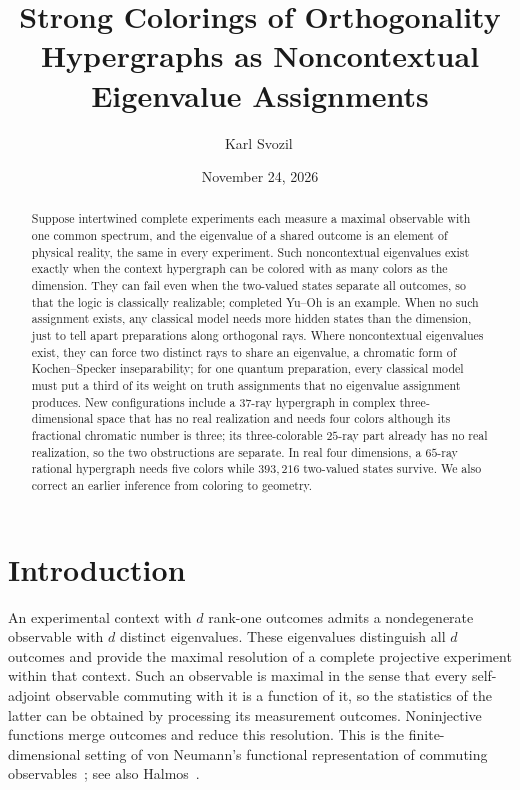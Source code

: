 \documentclass[aps,pra,reprint,superscriptaddress,longbibliography,nofootinbib,floatfix,10pt]{revtex4-2}
\theoremstyle{definition}\newtheorem{definition}[theorem]{Definition}
\theoremstyle{remark}\newtheorem{remark}[theorem]{Remark}
\begin{document}
\title{Strong Colorings of Orthogonality Hypergraphs as Noncontextual Eigenvalue Assignments}
\author{Karl Svozil\,}
\date{November 24, 2026}
\begin{abstract}
Suppose intertwined complete experiments each measure a maximal observable with one common spectrum, and the eigenvalue of a shared outcome is an element of physical reality, the same in every experiment. Such noncontextual eigenvalues exist exactly when the context hypergraph can be colored with as many colors as the dimension. They can fail even when the two-valued states separate all outcomes, so that the logic is classically realizable; completed Yu--Oh is an example. When no such assignment exists, any classical model needs more hidden states than the dimension, just to tell apart preparations along orthogonal rays. Where noncontextual eigenvalues exist, they can force two distinct rays to share an eigenvalue, a chromatic form of Kochen--Specker inseparability; for one quantum preparation, every classical model must put a third of its weight on truth assignments that no eigenvalue assignment produces. New configurations include a $37$-ray hypergraph in complex three-dimensional space that has no real realization and needs four colors although its fractional chromatic number is three; its three-colorable $25$-ray part already has no real realization, so the two obstructions are separate. In real four dimensions, a $65$-ray rational hypergraph needs five colors while $393{,}216$ two-valued states survive. We also correct an earlier inference from coloring to geometry.
\end{abstract}
\maketitle
\section{Introduction}\label{sec:intro}

An experimental context with $d$ rank-one outcomes admits a nondegenerate observable with $d$ distinct eigenvalues. These eigenvalues distinguish all $d$ outcomes and provide the maximal resolution of a complete projective experiment within that context. Such an observable is maximal in the sense that every self-adjoint observable commuting with it is a function of it, so the statistics of the latter can be obtained by processing its measurement outcomes. Noninjective functions merge outcomes and reduce this resolution. This is the finite-dimensional setting of von Neumann's functional representation of commuting observables~\cite[Satz~8, p.~221]{v-neumann-31}; see also Halmos~\cite[\S84, pp.~171--172]{halmos-vs}.
\end{document}
